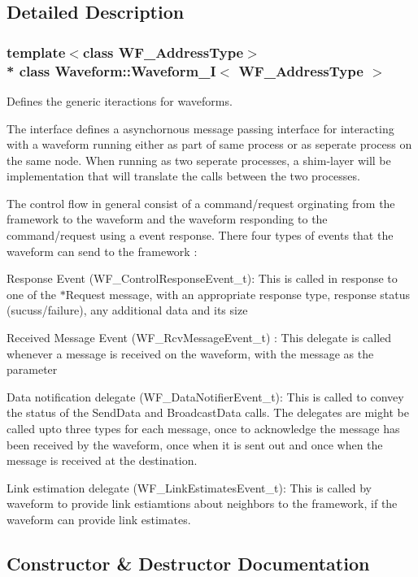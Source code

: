 \subsection{Detailed Description}
\subsubsection*{template$<$class W\+F\+\_\+\+Address\+Type$>$\\*
class Waveform\+::\+Waveform\+\_\+\+I$<$ W\+F\+\_\+\+Address\+Type $>$}

Defines the generic iteractions for waveforms. 

The interface defines a asynchornous message passing interface for interacting with a waveform running either as part of same process or as seperate process on the same node. When running as two seperate processes, a shim-\/layer will be implementation that will translate the calls between the two processes.

The control flow in general consist of a command/request orginating from the framework to the waveform and the waveform responding to the command/request using a event response. There four types of events that the waveform can send to the framework \+:
\begin{DoxyEnumerate}
\item Response Event (W\+F\+\_\+\+Control\+Response\+Event\+\_\+t)\+: This is called in response to one of the $\ast$\+Request message, with an appropriate response type, response status (sucuss/failure), any additional data and its size
\item Received Message Event (W\+F\+\_\+\+Rcv\+Message\+Event\+\_\+t) \+: This delegate is called whenever a message is received on the waveform, with the message as the parameter
\item Data notification delegate (W\+F\+\_\+\+Data\+Notifier\+Event\+\_\+t)\+: This is called to convey the status of the Send\+Data and Broadcast\+Data calls. The delegates are might be called upto three types for each message, once to acknowledge the message has been received by the waveform, once when it is sent out and once when the message is received at the destination.
\item Link estimation delegate (W\+F\+\_\+\+Link\+Estimates\+Event\+\_\+t)\+: This is called by waveform to provide link estiamtions about neighbors to the framework, if the waveform can provide link estimates. 
\end{DoxyEnumerate}

\subsection{Constructor \& Destructor Documentation}
